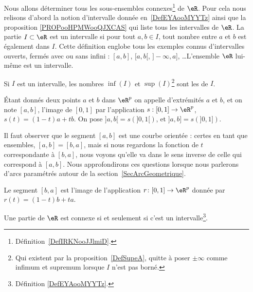 Nous allons déterminer tous les sous-ensembles connexes\footnote{Définition~\ref{DefIRKNooJJlmiD}.} de \( \eR\). Pour cela nous relisons d'abord la notion d'intervalle donnée en~\ref{DefEYAooMYYTz} ainsi que la proposition \ref{PROPooHPMWooQJXCAS} qui liste tous les intervalles de \( \eR\). La partie \( I\subset \eR\) est un intervalle si pour tout \( a,b\in I\), tout nombre entre \( a\) et \( b\) est également dans \( I\). Cette définition englobe tous les exemples connus d'intervalles ouverts, fermés avec ou sans infini : \( [a,b]\), \( [a,b[\), \( ]-\infty,a]\), \ldots L'ensemble \( \eR\) lui-même est un intervalle.

Si \( I\) est un intervalle, les nombres \( \inf(I)\) et \( \sup(I)\)\footnote{Qui existent par la proposition~\ref{DefSupeA}, quitte à poser \( \pm\infty\) comme infimum et supremum lorsque \( I\) n'est pas borné.} sont les  de \( I\).

\begin{definition}      \label{DefLISOooDHLQrl}
	Étant donnés deux points \( a\) et \( b\) dans \( \eR^p\) on appelle  d'extrémités \( a\) et \( b\), et on note \( [a,b]\), l'image de \( [0,1]\) par l'application \( s: [0,1]\to \eR^p\), \( s(t)= (1-t)a+tb\).  On pose \( ]a,b[=s\left(]0,1[\right)\), et  \( ]a,b]=s\left(]0,1]\right)\).
\end{definition}
Il faut observer que le segment \( [a,b]\) est une courbe orientée : certes en tant que ensembles, \( [a,b]=[b,a]\), mais si nous regardons la fonction de \( t\) correspondante à \( [b,a]\), nous voyons qu'elle va dans le sens inverse de celle qui correspond à \( [a,b]\). Nous approfondirons ces questions lorsque nous parlerons d'arcs paramétrés autour de la section~\ref{SecArcGeometrique}.

Le segment \( [b,a]\) est l'image de l'application \( r\colon [0,1]\to \eR^p\) donnée par \( r(t)=(1-t)b+ta\).

\begin{proposition} \label{PropInterssiConn}
	Une partie de \( \eR\) est connexe si et seulement si c'est un intervalle\footnote{Définition \ref{DefEYAooMYYTz}.}.
\end{proposition}

